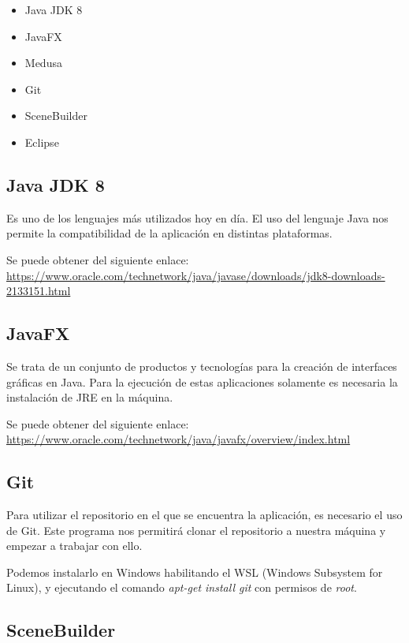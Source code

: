 \begin{itemize}
\item
Java JDK 8
\item
JavaFX
\item
Medusa\cite{javafx:medusa}
\item
Git
\item
SceneBuilder
\item
Eclipse
\end{itemize}

\subsection{Java JDK 8}

Es uno de los lenguajes más utilizados hoy en día. El uso del lenguaje Java nos permite la compatibilidad de la aplicación en distintas plataformas.

Se puede obtener del siguiente enlace: \url{https://www.oracle.com/technetwork/java/javase/downloads/jdk8-downloads-2133151.html}

\subsection{JavaFX}

Se trata de un conjunto de productos y tecnologías para la creación de interfaces gráficas en Java. Para la ejecución de estas aplicaciones solamente es necesaria la instalación de JRE en la máquina.

Se puede obtener del siguiente enlace:
\url{https://www.oracle.com/technetwork/java/javafx/overview/index.html}

\subsection{Git}

Para utilizar el repositorio en el que se encuentra la aplicación, es necesario el uso de Git. Este programa nos permitirá clonar el repositorio a nuestra máquina y empezar a trabajar con ello.

Podemos instalarlo en Windows habilitando el WSL (Windows Subsystem for Linux), y ejecutando el comando \emph{apt-get install git} con permisos de \emph{root}.


\subsection{SceneBuilder}

